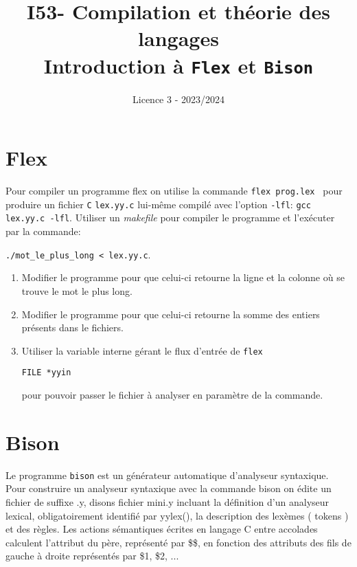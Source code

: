 \documentclass[a4paper,10pt, oneside]{article}
\begin{document}
\title{I53- Compilation et théorie des langages \\ Introduction à \texttt{Flex} et \texttt{Bison}}

\date{Licence 3 - 2023/2024}
\maketitle
\section{Flex}

Pour compiler un programme flex on utilise la commande \texttt{flex
prog.lex } pour produire un fichier \texttt{C} \texttt{lex.yy.c}
lui-même compilé avec l'option \texttt{-lfl}: \texttt{gcc lex.yy.c
-lfl}. Utiliser un \textit{makefile} pour compiler le programme et
l'exécuter par la commande:

\texttt{./mot\_le\_plus\_long < lex.yy.c}.

\begin{enumerate}

\item Modifier le programme pour que celui-ci retourne la ligne et la
  colonne où se trouve le mot le plus long.

\item Modifier le programme pour que celui-ci retourne la somme des
  entiers présents dans le fichiers.

\item Utiliser la variable interne gérant le flux d'entrée
de \texttt{flex}

  \begin{lstlisting}
FILE *yyin
  \end{lstlisting}

pour pouvoir passer le fichier à analyser en paramètre de la commande.

\end{enumerate}

\section{Bison}

Le programme \texttt{bison} est un générateur automatique d'analyseur
syntaxique. Pour construire un analyseur syntaxique avec la commande
bison on édite un fichier de suffixe .y, disons fichier mini.y
incluant la définition d'un analyseur lexical, obligatoirement
identifié par yylex(), la description des lexèmes ( tokens ) et des
règles. Les actions sémantiques écrites en langage C entre accolades
calculent l'attribut du père, représenté par \$\$, en fonction des
attributs des fils de gauche à droite représentés par \$1, \$2, ...
\end{document}
